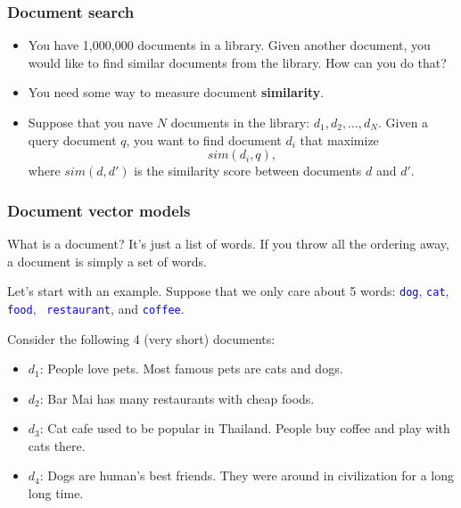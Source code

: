 \begin{frame}
\end{frame}

\begin{frame}
  \frametitle{Document search}
  \begin{itemize}
  \item You have 1,000,000 documents in a library.  Given another
    document, you would like to find similar documents from the
    library.  How can you do that?
    \pause
  \item You need some way to measure document {\bf similarity}.
    \pause
  \item Suppose that you nave $N$ documents in the library:
    $d_1,d_2,\ldots, d_N$.  Given a query document $q$, you want to
    find document $d_i$ that maximize
    \[
    sim(d_i,q),
    \]
    where $sim(d,d')$ is the similarity score between documents $d$
    and $d'$.
  \end{itemize}
\end{frame}

\begin{frame}
  \frametitle{Document vector models}

  What is a document? \pause It's just a list of words.  \pause If you
  throw all the ordering away, a document is simply a set of words.

  \pause Let's start with an example.  Suppose that we only care about
  5 words: \textcolor{blue}{{\tt dog}, {\tt cat}, {\tt food}, {\tt
      restaurant},} and \textcolor{blue}{\tt coffee}.

  \pause Consider the following 4 (very short) documents:

  \begin{itemize}
  \item $d_1$: {\tiny People love pets.  Most famous pets are cats and
    dogs.} \\
  \item $d_2$: {\tiny Bar Mai has many restaurants with cheap foods.} \\
  \item $d_3$: {\tiny Cat cafe used to be popular in Thailand.  People
    buy coffee and play with cats there.} \\
  \item $d_4$: {\tiny Dogs are human's best friends.  They were around
    in civilization for a long long time.} \\
  \end{itemize}

\end{frame}


